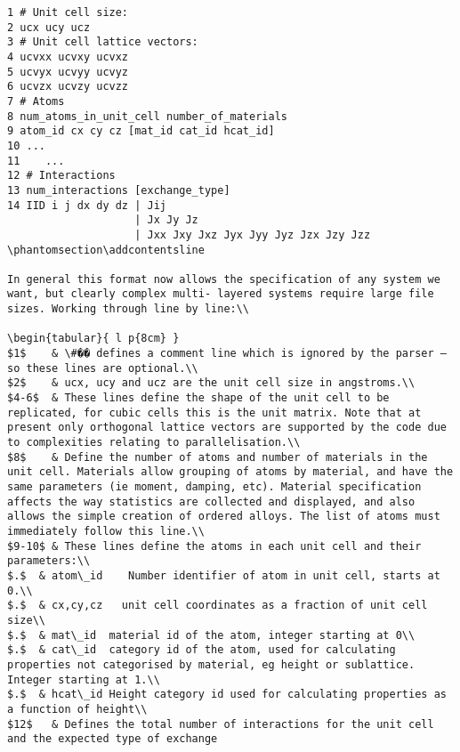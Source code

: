 \begin{verbatim}
1 # Unit cell size:
2 ucx ucy ucz
3 # Unit cell lattice vectors:
4 ucvxx ucvxy ucvxz
5 ucvyx ucvyy ucvyz
6 ucvzx ucvzy ucvzz
7 # Atoms
8 num_atoms_in_unit_cell number_of_materials
9 atom_id cx cy cz [mat_id cat_id hcat_id]
10 ...
11    ...
12 # Interactions
13 num_interactions [exchange_type] 
14 IID i j dx dy dz | Jij
                    | Jx Jy Jz
                    | Jxx Jxy Jxz Jyx Jyy Jyz Jzx Jzy Jzz
\phantomsection\addcontentsline

In general this format now allows the specification of any system we want, but clearly complex multi- layered systems require large file sizes. Working through line by line:\\

\begin{tabular}{ l p{8cm} }
$1$    & \#�� defines a comment line which is ignored by the parser – so these lines are optional.\\
$2$    & ucx, ucy and ucz are the unit cell size in angstroms.\\
$4-6$  & These lines define the shape of the unit cell to be replicated, for cubic cells this is the unit matrix. Note that at present only orthogonal lattice vectors are supported by the code due to complexities relating to parallelisation.\\
$8$    & Define the number of atoms and number of materials in the unit cell. Materials allow grouping of atoms by material, and have the same parameters (ie moment, damping, etc). Material specification affects the way statistics are collected and displayed, and also allows the simple creation of ordered alloys. The list of atoms must immediately follow this line.\\
$9-10$ & These lines define the atoms in each unit cell and their parameters:\\
$.$	 & atom\_id    Number identifier of atom in unit cell, starts at 0.\\
$.$	 & cx,cy,cz   unit cell coordinates as a fraction of unit cell size\\
$.$	 & mat\_id  material id of the atom, integer starting at 0\\
$.$	 & cat\_id  category id of the atom, used for calculating properties not categorised by material, eg height or sublattice. Integer starting at 1.\\
$.$	 & hcat\_id Height category id used for calculating properties as a function of height\\
$12$   & Defines the total number of interactions for the unit cell and the expected type of exchange

\end{verbatim}

